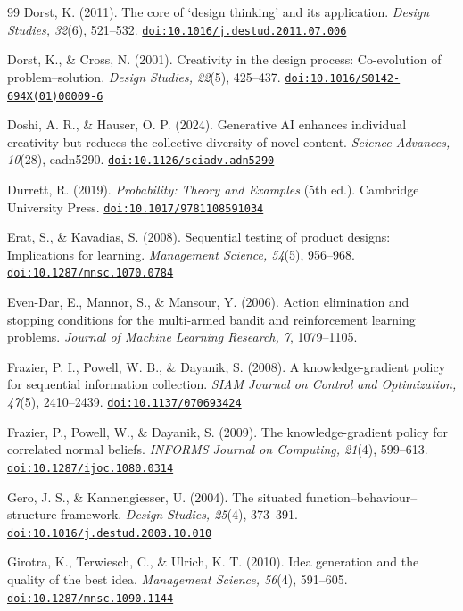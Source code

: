 \documentclass[10pt,twocolumn]{article}
\providecommand{\doi}[1]{\href{https://doi.org/#1}{\nolinkurl{doi:#1}}}
\theoremstyle{definition}
\begin{document}
\begin{thebibliography}{99}
 Dorst, K. (2011). The core of `design thinking' and its application. \textit{Design Studies, 32}(6), 521--532. \doi{10.1016/j.destud.2011.07.006}

 Dorst, K., \& Cross, N. (2001). Creativity in the design process: Co-evolution of problem--solution. \textit{Design Studies, 22}(5), 425--437. \doi{10.1016/S0142-694X(01)00009-6}

 Doshi, A. R., \& Hauser, O. P. (2024). Generative AI enhances individual creativity but reduces the collective diversity of novel content. \textit{Science Advances, 10}(28), eadn5290. \doi{10.1126/sciadv.adn5290}

 Durrett, R. (2019). \textit{Probability: Theory and Examples} (5th ed.). Cambridge University Press. \doi{10.1017/9781108591034}

 Erat, S., \& Kavadias, S. (2008). Sequential testing of product designs: Implications for learning. \textit{Management Science, 54}(5), 956--968. \doi{10.1287/mnsc.1070.0784}

 Even-Dar, E., Mannor, S., \& Mansour, Y. (2006). Action elimination and stopping conditions for the multi-armed bandit and reinforcement learning problems. \textit{Journal of Machine Learning Research, 7}, 1079--1105.

 Frazier, P. I., Powell, W. B., \& Dayanik, S. (2008). A knowledge-gradient policy for sequential information collection. \textit{SIAM Journal on Control and Optimization, 47}(5), 2410--2439. \doi{10.1137/070693424}

 Frazier, P., Powell, W., \& Dayanik, S. (2009). The knowledge-gradient policy for correlated normal beliefs. \textit{INFORMS Journal on Computing, 21}(4), 599--613. \doi{10.1287/ijoc.1080.0314}

 Gero, J. S., \& Kannengiesser, U. (2004). The situated function--behaviour--structure framework. \textit{Design Studies, 25}(4), 373--391. \doi{10.1016/j.destud.2003.10.010}

 Girotra, K., Terwiesch, C., \& Ulrich, K. T. (2010). Idea generation and the quality of the best idea. \textit{Management Science, 56}(4), 591--605. \doi{10.1287/mnsc.1090.1144}


\end{thebibliography}
\end{document}

